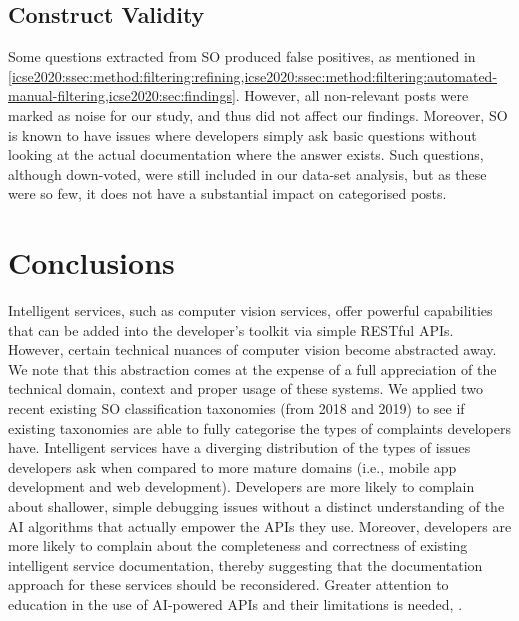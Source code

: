 \subsection{Construct Validity} Some questions extracted from SO produced false positives, as mentioned in \cref{icse2020:ssec:method:filtering:refining,icse2020:ssec:method:filtering:automated-manual-filtering,icse2020:sec:findings}. However, all non-relevant posts were marked as noise for our study, and thus did not affect our findings.
Moreover, SO is known to have issues where developers simply ask basic questions without looking at the actual documentation where the answer exists. Such questions, although down-voted, were still included in our data-set analysis, but as these were so few, it does not have a substantial impact on categorised posts.

\section{Conclusions}
\label{icse2020:sec:conclusions}

Intelligent services, such as computer vision services, offer powerful capabilities that can be added into the developer's toolkit via simple RESTful APIs. However, certain technical nuances of computer vision become abstracted away. We note that this abstraction comes at the expense of a full appreciation of the technical domain, context and proper usage of these systems. We applied two recent existing SO classification taxonomies (from 2018 and 2019) to see if existing taxonomies are able to fully categorise the types of complaints developers have. Intelligent services have a diverging distribution of the types of issues developers ask when compared to more mature domains (i.e., mobile app development and web development). Developers are more likely to complain about shallower, simple debugging issues without a distinct understanding of the AI algorithms that actually empower the APIs they use. Moreover, developers are more likely to complain about the completeness and correctness of existing intelligent service documentation, thereby suggesting that the documentation approach for these services should be reconsidered. Greater attention to education in the use of AI-powered APIs and their limitations is needed, .


